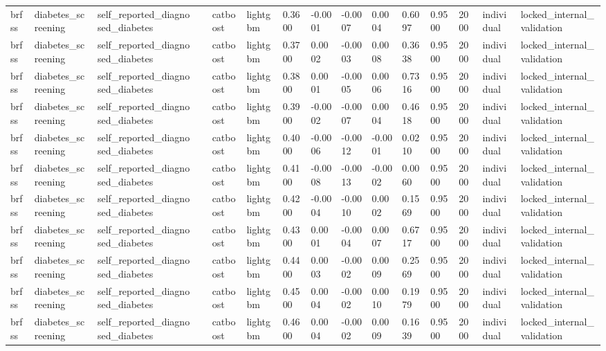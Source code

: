 \begin{tabular}{lllllllllllllll}
brfss & diabetes\_screening & self\_reported\_diagnosed\_diabetes &  & catboost & lightgbm & 0.3600 & -0.0001 & -0.0007 & 0.0004 & 0.6097 & 0.9500 & 2000 & individual & locked\_internal\_validation \\
brfss & diabetes\_screening & self\_reported\_diagnosed\_diabetes &  & catboost & lightgbm & 0.3700 & 0.0002 & -0.0003 & 0.0008 & 0.3638 & 0.9500 & 2000 & individual & locked\_internal\_validation \\
brfss & diabetes\_screening & self\_reported\_diagnosed\_diabetes &  & catboost & lightgbm & 0.3800 & 0.0001 & -0.0005 & 0.0006 & 0.7316 & 0.9500 & 2000 & individual & locked\_internal\_validation \\
brfss & diabetes\_screening & self\_reported\_diagnosed\_diabetes &  & catboost & lightgbm & 0.3900 & -0.0002 & -0.0007 & 0.0004 & 0.4618 & 0.9500 & 2000 & individual & locked\_internal\_validation \\
brfss & diabetes\_screening & self\_reported\_diagnosed\_diabetes &  & catboost & lightgbm & 0.4000 & -0.0006 & -0.0012 & -0.0001 & 0.0210 & 0.9500 & 2000 & individual & locked\_internal\_validation \\
brfss & diabetes\_screening & self\_reported\_diagnosed\_diabetes &  & catboost & lightgbm & 0.4100 & -0.0008 & -0.0013 & -0.0002 & 0.0060 & 0.9500 & 2000 & individual & locked\_internal\_validation \\
brfss & diabetes\_screening & self\_reported\_diagnosed\_diabetes &  & catboost & lightgbm & 0.4200 & -0.0004 & -0.0010 & 0.0002 & 0.1569 & 0.9500 & 2000 & individual & locked\_internal\_validation \\
brfss & diabetes\_screening & self\_reported\_diagnosed\_diabetes &  & catboost & lightgbm & 0.4300 & 0.0001 & -0.0004 & 0.0007 & 0.6717 & 0.9500 & 2000 & individual & locked\_internal\_validation \\
brfss & diabetes\_screening & self\_reported\_diagnosed\_diabetes &  & catboost & lightgbm & 0.4400 & 0.0003 & -0.0002 & 0.0009 & 0.2569 & 0.9500 & 2000 & individual & locked\_internal\_validation \\
brfss & diabetes\_screening & self\_reported\_diagnosed\_diabetes &  & catboost & lightgbm & 0.4500 & 0.0004 & -0.0002 & 0.0010 & 0.1979 & 0.9500 & 2000 & individual & locked\_internal\_validation \\
brfss & diabetes\_screening & self\_reported\_diagnosed\_diabetes &  & catboost & lightgbm & 0.4600 & 0.0004 & -0.0002 & 0.0009 & 0.1639 & 0.9500 & 2000 & individual & locked\_internal\_validation \\

\end{tabular}
